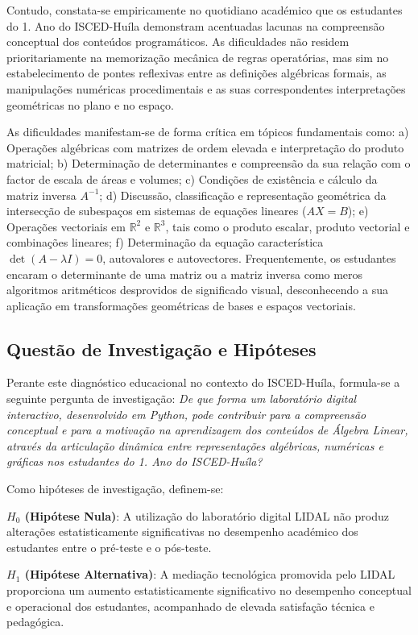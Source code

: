 \documentclass[conference]{IEEEtran}
\begin{document}
Contudo, constata-se empiricamente no quotidiano académico que os estudantes do 1.\textordmasculine{} Ano do ISCED-Huíla demonstram acentuadas lacunas na compreensão conceptual dos conteúdos programáticos. As dificuldades não residem prioritariamente na memorização mecânica de regras operatórias, mas sim no estabelecimento de pontes reflexivas entre as definições algébricas formais, as manipulações numéricas procedimentais e as suas correspondentes interpretações geométricas no plano e no espaço.

As dificuldades manifestam-se de forma crítica em tópicos fundamentais como: a) Operações algébricas com matrizes de ordem elevada e interpretação do produto matricial; b) Determinação de determinantes e compreensão da sua relação com o factor de escala de áreas e volumes; c) Condições de existência e cálculo da matriz inversa $A^{-1}$; d) Discussão, classificação e representação geométrica da intersecção de subespaços em sistemas de equações lineares ($AX = B$); e) Operações vectoriais em $\mathbb{R}^2$ e $\mathbb{R}^3$, tais como o produto escalar, produto vectorial e combinações lineares; f) Determinação da equação característica $\det(A-\lambda I) = 0$, autovalores e autovectores. Frequentemente, os estudantes encaram o determinante de uma matriz ou a matriz inversa como meros algoritmos aritméticos desprovidos de significado visual, desconhecendo a sua aplicação em transformações geométricas de bases e espaços vectoriais.

\subsection{Questão de Investigação e Hipóteses}

Perante este diagnóstico educacional no contexto do ISCED-Huíla, formula-se a seguinte pergunta de investigação: \textit{De que forma um laboratório digital interactivo, desenvolvido em Python, pode contribuir para a compreensão conceptual e para a motivação na aprendizagem dos conteúdos de Álgebra Linear, através da articulação dinâmica entre representações algébricas, numéricas e gráficas nos estudantes do 1.\textordmasculine{} Ano do ISCED-Huíla?}

Como hipóteses de investigação, definem-se:

\textbf{$H_0$ (Hipótese Nula)}: A utilização do laboratório digital LIDAL não produz alterações estatisticamente significativas no desempenho académico dos estudantes entre o pré-teste e o pós-teste.

\textbf{$H_1$ (Hipótese Alternativa)}: A mediação tecnológica promovida pelo LIDAL proporciona um aumento estatisticamente significativo no desempenho conceptual e operacional dos estudantes, acompanhado de elevada satisfação técnica e pedagógica.
\end{document}
